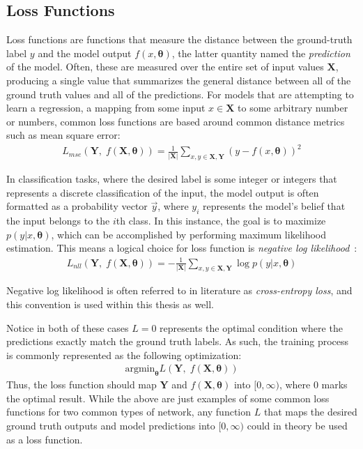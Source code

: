 \subsection{Loss Functions}
Loss functions are functions that measure the distance between the ground-truth label $y$ and the model output
$f(x, \mathbf{\theta})$, the latter quantity named the \textit{prediction} of the model.
Often, these are measured over the entire set of input values $\mathbf{X}$, producing a single value that summarizes the
general distance between all of the ground truth values and all of the predictions. For models that are attempting
to learn a regression, a mapping from some input $x\in \mathbf{X}$ to some arbitrary number or numbers, common loss functions are
based around common distance metrics such as mean square error:
\begin{align}
	L_{mse}(\mathbf{Y}, \;f\left(\mathbf{X}, \mathbf{\theta} \right)) = \frac{1}{|\mathbf{X}|} \sum_{x,y \in \mathbf{X}, \mathbf{Y}} \left(y - f(x, \mathbf{\theta})\right)^2
\end{align}

In classification tasks, where the desired label is some integer or integers that represents a discrete
classification of the input, the model output is often formatted as a probability vector $\vec{y}$, where $y_i$ represents
the model's belief that the input belongs to the $i$th class. In this instance, the goal is to maximize $p(y | x, \mathbf{\theta})$,
which can be accomplished by performing maximum likelihood estimation. This means a logical choice for loss function is \textit{negative log
likelihood}~\citep{goodfellow2016}:
\begin{align}
	L_{nll}(\mathbf{Y}, \;f\left(\mathbf{X}, \mathbf{\theta} \right))  = - \frac{1}{|\mathbf{X}|} \sum_{x,y \in \mathbf{X}, \mathbf{Y}} \log p(y | x, \mathbf{\theta} )
\end{align}

\noindent Negative log likelihood is often referred to in literature as \textit{cross-entropy loss}, and this convention is used
within this thesis as well.

Notice in both of these cases $L=0$ represents the optimal condition where the predictions exactly match the ground truth
labels. As such, the training process is commonly represented as the following optimization:
\begin{align}
	 \text{argmin}_{\mathbf{\theta}} L\left(\mathbf{Y}, \;f\left(\mathbf{X}, \mathbf{\theta} \right)\right)
\end{align}
\noindent Thus, the loss function should map $\mathbf{Y}$ and $f(\mathbf{X}, \mathbf{\theta} )$ into $[0, \infty)$, where 0 marks the optimal result.
While the above are just examples of some common loss functions for two common types of network, any function $L$ that maps
the desired ground truth outputs and model predictions into $[0, \infty)$ could in theory be used as a loss function.


